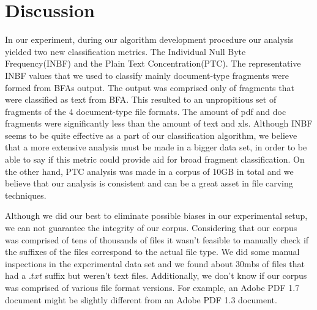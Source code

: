 \chapter{Discussion}
In our experiment, during our algorithm development procedure our analysis yielded two new classification metrics. The Individual Null Byte Frequency(INBF) and the Plain Text Concentration(PTC). The representative INBF values that we used to classify mainly document-type fragments were formed from BFAs output. The output was comprised only of fragments that were classified as text from BFA. This resulted to an unpropitious set of fragments of the 4 document-type file formats. The amount of pdf and doc fragments were significantly less than the amount of text and xls. Although INBF seems to be quite effective as a part of our classification algorithm, we believe that a more extensive analysis must be made in a bigger data set, in order to be able to say if this metric could provide aid for broad fragment classification. On the other hand, PTC analysis was made in a corpus of 10GB in total and we believe that our analysis is consistent and can be a great asset in file carving techniques.

Although we did our best to eliminate possible biases in our experimental setup, we can not guarantee the integrity of our corpus. Considering that our corpus was comprised of tens of thousands of files it wasn't feasible to manually check if the suffixes of the files correspond to the actual file type. We did some manual inspections in the experimental data set and we found about 30mbs of files that had a $.txt$ suffix but weren't text files. Additionally, we don't know if our corpus was comprised of various file format versions. For example, an Adobe PDF 1.7 document might be slightly different from an Adobe PDF 1.3 document.